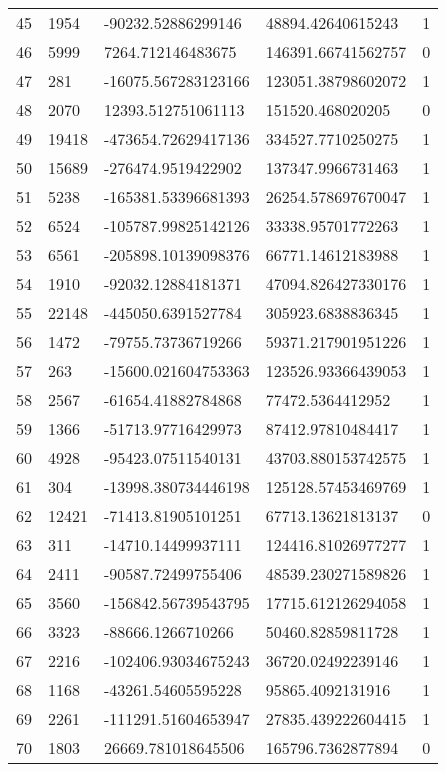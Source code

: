 \begin{longtable}{lllll}
    45 & 1954 & -90232.52886299146 & 48894.42640615243 & 1 \\
    46 & 5999 & 7264.712146483675 & 146391.66741562757 & 0 \\
    47 & 281 & -16075.567283123166 & 123051.38798602072 & 1 \\
    48 & 2070 & 12393.512751061113 & 151520.468020205 & 0 \\
    49 & 19418 & -473654.72629417136 & 334527.7710250275 & 1 \\
    50 & 15689 & -276474.9519422902 & 137347.9966731463 & 1 \\
    51 & 5238 & -165381.53396681393 & 26254.578697670047 & 1 \\
    52 & 6524 & -105787.99825142126 & 33338.95701772263 & 1 \\
    53 & 6561 & -205898.10139098376 & 66771.14612183988 & 1 \\
    54 & 1910 & -92032.12884181371 & 47094.826427330176 & 1 \\
    55 & 22148 & -445050.6391527784 & 305923.6838836345 & 1 \\
    56 & 1472 & -79755.73736719266 & 59371.217901951226 & 1 \\
    57 & 263 & -15600.021604753363 & 123526.93366439053 & 1 \\
    58 & 2567 & -61654.41882784868 & 77472.5364412952 & 1 \\
    59 & 1366 & -51713.97716429973 & 87412.97810484417 & 1 \\
    60 & 4928 & -95423.07511540131 & 43703.880153742575 & 1 \\
    61 & 304 & -13998.380734446198 & 125128.57453469769 & 1 \\
    62 & 12421 & -71413.81905101251 & 67713.13621813137 & 0 \\
    63 & 311 & -14710.14499937111 & 124416.81026977277 & 1 \\
    64 & 2411 & -90587.72499755406 & 48539.230271589826 & 1 \\
    65 & 3560 & -156842.56739543795 & 17715.612126294058 & 1 \\
    66 & 3323 & -88666.1266710266 & 50460.82859811728 & 1 \\
    67 & 2216 & -102406.93034675243 & 36720.02492239146 & 1 \\
    68 & 1168 & -43261.54605595228 & 95865.4092131916 & 1 \\
    69 & 2261 & -111291.51604653947 & 27835.439222604415 & 1 \\
    70 & 1803 & 26669.781018645506 & 165796.7362877894 & 0 \\

\end{longtable}
